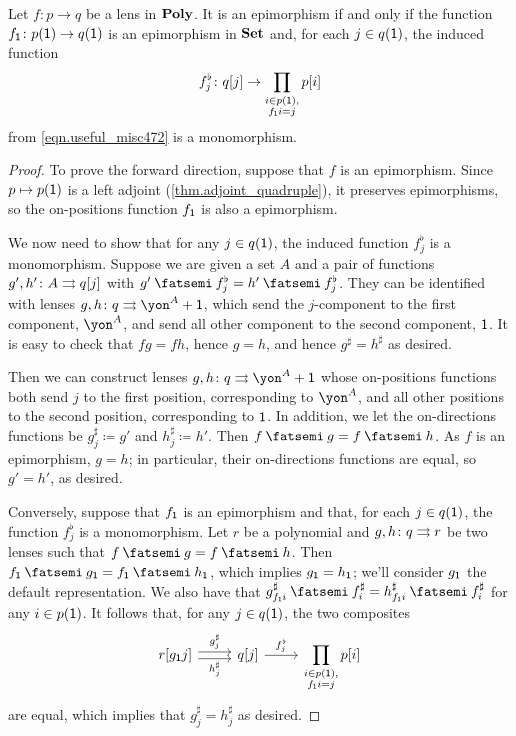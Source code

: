 \documentclass[Book-Poly]{subfiles}
\begin{document}
\begin{proposition}\label{prop.epis_in_poly}
Let $f \colon p \to q$ be a lens in $\mathbf{Poly}$. It is an epimorphism if and only if the function $f_{\textsf{1}} \colon p(\textsf{1}) \to q(\textsf{1})$ is an epimorphism in $\mathbf{Set}$ and, for each $j\in q(\textsf{1})$, the induced function
\[
    f^\flat_j \colon q[j] \to \prod_{\substack{i\in p(\textsf{1}), \\ f_{\textsf{1}}i=j}} p[i]
\]
from \eqref{eqn.useful_misc472} is a monomorphism.
\end{proposition}
\begin{proof}
To prove the forward direction, suppose that $f$ is an epimorphism. Since $p \mapsto p(\textsf{1})$ is a left adjoint (\cref{thm.adjoint_quadruple}), it preserves epimorphisms, so the on-positions function $f_{\textsf{1}}$ is also a epimorphism.

We now need to show that for any $j\in q(\textsf{1})$, the induced function $f^\flat_j$ is a monomorphism.
Suppose we are given a set $A$ and a pair of functions $g',h'\colon A\rightrightarrows q[j]$ with $g' \then f^\flat_j = h' \then f^\flat_j$.
They can be identified with lenses $g,h\colon q\tto \yon^A+\1$, which send the $j$-component to the first component, $\yon^A$, and send all other component to the second component, $\textsf{1}$. It is easy to check that $fg=fh$, hence $g=h$, and hence $g^\sharp=h^\sharp$ as desired.

Then we can construct lenses $g,h \colon q \tto \yon^A+\1$ whose on-positions functions both send $j$ to the first position, corresponding to $\yon^A$, and all other positions to the second position, corresponding to $\textsf{1}$.
In addition, we let the on-directions functions be $g^\sharp_j \coloneqq g'$ and $h^\sharp_j \coloneqq h'$.
Then $f \then g = f \then h$.
As $f$ is an epimorphism, $g = h$; in particular, their on-directions functions are equal, so $g' = h'$, as desired.

Conversely, suppose that $f_{\textsf{1}}$ is an epimorphism and that, for each $j\in q(\textsf{1})$, the function $f^\flat_j$ is a monomorphism.
Let $r$ be a polynomial and $g,h\colon q\rightrightarrows r$ be two lenses such that $f \then g = f \then h$.
Then $f_\1 \then g_\1 = f_\1 \then h_\1$, which implies $g_{\textsf{1}}=h_{\textsf{1}}$; we'll consider $g_{\textsf{1}}$ the default representation.
We also have that $g^\sharp_{f_\1i} \then f^\sharp_i = h^\sharp_{f_\1i} \then f^\sharp_i$ for any $i\in p(\textsf{1})$.
It follows that, for any $j \in q(\textsf{1})$, the two composites
\[
\begin{tikzcd}
	r[g_\1j] \ar[r, shift left, "g^\sharp_j"] \ar[r, shift right, "h^\sharp_j"'] & q[j] \ar[r, "f^\flat_j"] & \displaystyle\prod_{\substack{i\in p(\1), \\ f_\1i=j}} p[i]
\end{tikzcd}
\]
are equal, which implies that $g^\sharp_j=h^\sharp_j$ as desired.
\end{proof}
\end{document}
